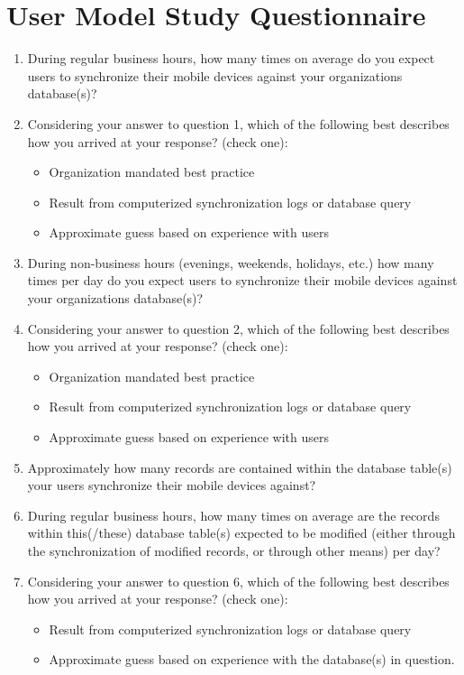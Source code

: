 \chapter{User Model Study Questionnaire}\label{modelquestions}



\begin{enumerate}
\item During regular business hours, how many times on average do you expect users to synchronize their mobile devices against your organizations database(s)?
\item Considering your answer to question 1, which of the following best describes how you arrived at your response? (check one):
\begin{itemize}
\item Organization mandated best practice
\item Result from computerized synchronization logs or database query
\item Approximate guess based on experience with users
\end{itemize}
\item During non-business hours (evenings, weekends, holidays, etc.) how many times per day do you expect users to synchronize their mobile devices against your organizations database(s)?
\item Considering your answer to question 2, which of the following best describes how you arrived at your response? (check one):
\begin{itemize}
\item Organization mandated best practice
\item Result from computerized synchronization logs or database query
\item Approximate guess based on experience with users
\end{itemize}
\item Approximately how many records are contained within the database table(s) your users synchronize their mobile devices against?
\item During regular business hours, how many times on average are the records within this(/these) database table(s) expected to be modified (either through the synchronization of modified records, or through other means) per day?
\item Considering your answer to question 6, which of the following best describes how you arrived at your response? (check one):
\begin{itemize}
\item Result from computerized synchronization logs or database query
\item Approximate guess based on experience with the database(s) in question.
\end{itemize}
\end{enumerate}
